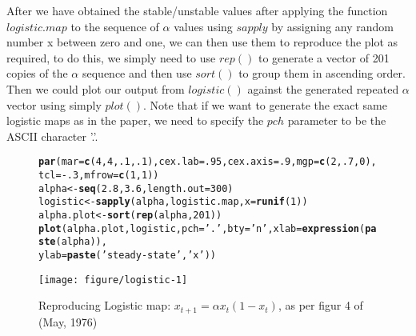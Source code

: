 \documentclass[12pt]{article}\usepackage[]{graphicx}\usepackage[]{color}
\makeatletter
\def\maxwidth{ %
  \ifdim\Gin@nat@width>\linewidth
    \linewidth
  \else
    \Gin@nat@width
  \fi
}
\newcommand{\hlnum}[1]{\textcolor[rgb]{0.686,0.059,0.569}{#1}}%
\newcommand{\hlstr}[1]{\textcolor[rgb]{0.192,0.494,0.8}{#1}}%
\newcommand{\hlopt}[1]{\textcolor[rgb]{0,0,0}{#1}}%
\newcommand{\hlstd}[1]{\textcolor[rgb]{0.345,0.345,0.345}{#1}}%
\newcommand{\hlkwb}[1]{\textcolor[rgb]{0.69,0.353,0.396}{#1}}%
\newcommand{\hlkwc}[1]{\textcolor[rgb]{0.333,0.667,0.333}{#1}}%
\newcommand{\hlkwd}[1]{\textcolor[rgb]{0.737,0.353,0.396}{\textbf{#1}}}%
\newenvironment{kframe}{%
 \def\at@end@of@kframe{}%
 \ifinner\ifhmode%
  \def\at@end@of@kframe{\end{minipage}}%
  \begin{minipage}{\columnwidth}%
 \fi\fi%
 \def\FrameCommand##1{\hskip\@totalleftmargin \hskip-\fboxsep
 \colorbox{shadecolor}{##1}\hskip-\fboxsep
     \hskip-\linewidth \hskip-\@totalleftmargin \hskip\columnwidth}%
 \MakeFramed {\advance\hsize-\width
   \@totalleftmargin\z@ \linewidth\hsize
   \@setminipage}}%
 {\par\unskip\endMakeFramed%
 \at@end@of@kframe}
\newenvironment{knitrout}{}{} %
\makeatother
\begin{document}
After we have obtained the stable/unstable values after applying the function $logistic.map$ to the sequence of $\alpha$ values using $sapply$ by assigning any random number x between zero and one, we can then use them to reproduce the plot as required, to do this, we simply need to use $rep()$ to generate a vector of 201 copies of the $\alpha$ sequence and then use $sort()$ to group them in ascending order. Then we could plot our output from $logistic()$ against the generated repeated $\alpha$ vector using simply $plot()$. Note that if we want to generate the exact same logistic maps as in the paper, we need to specify the $pch$ parameter to be the ASCII character '.'. 


\begin{figure}
\begin{center}
\begin{knitrout}
\color{fgcolor}\begin{kframe}
\begin{alltt}
\hlkwd{par}\hlstd{(}\hlkwc{mar}\hlstd{=}\hlkwd{c}\hlstd{(}\hlnum{4}\hlstd{,}\hlnum{4}\hlstd{,}\hlnum{.1}\hlstd{,}\hlnum{.1}\hlstd{),}\hlkwc{cex.lab}\hlstd{=}\hlnum{.95}\hlstd{,}\hlkwc{cex.axis}\hlstd{=}\hlnum{.9}\hlstd{,}\hlkwc{mgp}\hlstd{=}\hlkwd{c}\hlstd{(}\hlnum{2}\hlstd{,}\hlnum{.7}\hlstd{,}\hlnum{0}\hlstd{),}\hlkwc{tcl}\hlstd{=}\hlopt{-}\hlnum{.3}\hlstd{,} \hlkwc{mfrow}\hlstd{=}\hlkwd{c}\hlstd{(}\hlnum{1}\hlstd{,} \hlnum{1}\hlstd{))}
\hlstd{alpha} \hlkwb{<-} \hlkwd{seq}\hlstd{(}\hlnum{2.8}\hlstd{,} \hlnum{3.6}\hlstd{,} \hlkwc{length.out} \hlstd{=} \hlnum{300}\hlstd{)}
\hlstd{logistic} \hlkwb{<-} \hlkwd{sapply}\hlstd{(alpha, logistic.map,} \hlkwc{x} \hlstd{=} \hlkwd{runif}\hlstd{(}\hlnum{1}\hlstd{))}
\hlstd{alpha.plot} \hlkwb{<-} \hlkwd{sort}\hlstd{(}\hlkwd{rep}\hlstd{(alpha,} \hlnum{201}\hlstd{))}
\hlkwd{plot}\hlstd{(alpha.plot, logistic,} \hlkwc{pch} \hlstd{=} \hlstr{'.'}\hlstd{,} \hlkwc{bty} \hlstd{=} \hlstr{'n'}\hlstd{,} \hlkwc{xlab} \hlstd{=} \hlkwd{expression}\hlstd{(}\hlkwd{paste}\hlstd{(alpha)),}
     \hlkwc{ylab} \hlstd{=} \hlkwd{paste}\hlstd{(}\hlstr{'steady-state'}\hlstd{,}\hlstr{'x'}\hlstd{))}
\end{alltt}
\end{kframe}
\texttt{[image: figure/logistic-1]} 

\end{knitrout}
\caption{Reproducing Logistic map: $x_{t+1} = \alpha x_{t}(1-x_{t})$, as per figur 4 of (May, 1976)}
\label{fig:six}
\end{center}
\end{figure}
\end{document}
